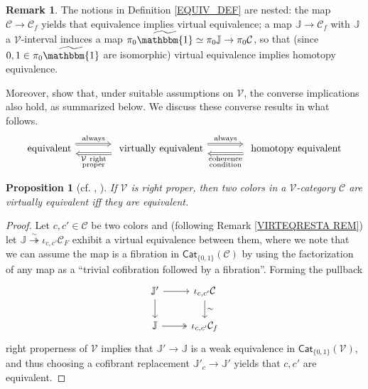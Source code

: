 \documentclass[a4paper,10pt
 ,final
]{article}%
\numberwithin{equation}{section}
\numberwithin{figure}{section}
\newtheorem{proposition}[equation]{Proposition}%
\theoremstyle{definition} %
\newtheorem{remark}[equation]{Remark}%
\newcommand{\V}{\ensuremath{\mathcal V}}
\newcommand{\1}{\ensuremath{\mathbbm 1}}%
\begin{document}
\begin{remark}\label{EQUIVNEST_REM}
The notions in Definition \ref{EQUIV_DEF}
are nested: the map $\mathcal{C} \to \mathcal{C}_f$
yields that equivalence implies virtual equivalence;
a map $\mathbb{J} \to \mathcal{C}_f$
with $\mathbb{J}$ a $\mathcal{V}$-interval
induces a map
$\pi_0 \widetilde{\mathbbm{1}} \simeq \pi_0 \mathbb{J} \to \pi_0 \mathcal{C}$,
so that (since $0,1 \in \pi_0 \widetilde{\mathbbm{1}}$ are isomorphic)
virtual equivalence implies homotopy equivalence.

Moreover, \cite{BM13,Cav} show that, under suitable assumptions on $\V$, the converse implications also hold, as summarized below.
We discuss these converse results in what follows.
\begin{equation}\label{BASCOMP EQ}
\begin{tikzcd}[column sep = large]
            \mbox{equivalent}
            \arrow[r, Rightarrow, shift left=2, "\mathrm{always}"]
            &
            \mbox{ virtually equivalent}
            \arrow[r, Rightarrow, shift left=2, "\mathrm{always}"]
            \arrow[l, Rightarrow, shift left = 2, "\substack{$\V\phantom{ }$\mathrm{right} \\ \mathrm{proper}}"]
            &
            \mbox{ homotopy equivalent}
            \arrow[l, Rightarrow, shift left = 2, "\substack{\mathrm{coherence} \\ \mathrm{condition}}"]
\end{tikzcd}
\end{equation}
\end{remark}



\begin{proposition}[{cf. \cite[4.12]{Cav}, \cite[2.10]{BM13}}] \label{RIGHTPROPER PROP}
If $\V$ is right proper, then two colors in a $\V$-category $\mathcal{C}$ are virtually equivalent iff they are equivalent. 
\end{proposition}


\begin{proof}
Let $c,c'\in \mathcal{C}$ be two colors and (following Remark \ref{VIRTEQRESTA REM})
let $\mathbb{J} \overset{\sim}{\twoheadrightarrow} \iota_{c,c'} \mathcal{C}_F$
exhibit a virtual equivalence between them, where we note
that we can assume the map is a fibration in $\mathsf{Cat}_{\{0,1\}}(\mathcal{C})$
by using the factorization of any map as a ``trivial cofibration followed by a fibration''.
Forming the pullback
\begin{equation}\label{RIGHTPROPER EQ}
\begin{tikzcd}
		 \mathbb{J}' \ar{r} \arrow{d}
	&
		\iota_{c,c'} \mathcal{C} \arrow{d}{\sim}
\\
		\mathbb{J} \ar[twoheadrightarrow]{r} 
	&
		\iota_{c,c'}\mathcal{C}_f
\end{tikzcd}
\end{equation}
right properness of $\V$ implies 
that $\mathbb{J}' \to \mathbb{J}$ is a weak equivalence in 
$\mathsf{Cat}_{\{0,1\}}(\V)$,
and thus choosing a cofibrant replacement
$\mathbb{J}'_c \to \mathbb{J}'$
yields that $c,c'$ are equivalent.
\end{proof}
\end{document}
